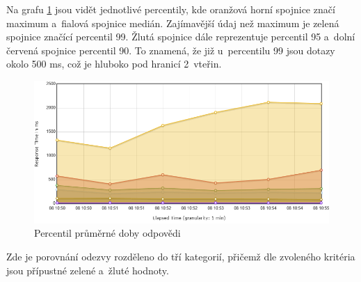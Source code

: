 \noindent
Na grafu \ref{fig:percentil-response-radegast} jsou vidět jednotlivé percentily, kde oranžová horní spojnice značí maximum a~fialová spojnice medián. Zajímavější údaj než maximum je zelená spojnice značící percentil 99. Žlutá spojnice dále reprezentuje percentil 95 a~dolní červená spojnice percentil 90. To znamená, že již u~percentilu 99 jsou dotazy okolo 500 ms, což je hluboko pod hranicí 2~vteřin.

\begin{figure}[htbp]
    \centering
        \includegraphics[scale=.5]{obrazky-figures/testing/performance/radegast/flotResponseTimePercentilesOverTime.png}
        \caption{Percentil průměrné doby odpovědi}
        \label{fig:percentil-response-radegast}
\end{figure}
\newpage
\noindent
Zde je porovnání odezvy rozděleno do tří kategorií, přičemž dle zvoleného kritéria jsou přípustné zelené a~žluté hodnoty.


